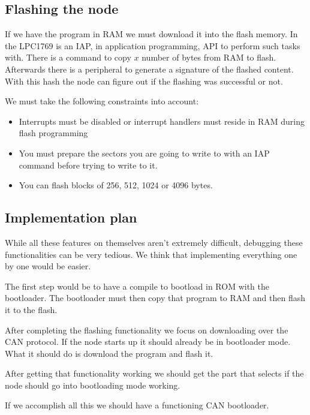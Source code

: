 \documentclass[twocolumn]{article}
\begin{document}
	\subsection*{Flashing the node}
		If we have the program in RAM we must download it into the flash memory.
		In the LPC1769 is an IAP, in application programming, API to perform such tasks with.
		There is a command to copy $x$ number of bytes from RAM to flash.
		Afterwards there is a peripheral to generate a signature of the flashed content.
		With this hash the node can figure out if the flashing was successful or not.
		
		We must take the following constraints into account:
		\begin{itemize}
			\item Interrupts must be disabled or interrupt handlers must reside in RAM during flash programming
			\item You must prepare the sectors you are going to write to with an IAP command before trying to write to it.
			\item You can flash blocks of 256, 512, 1024 or 4096 bytes.
		\end{itemize}
	
	
	
	
	
	
	
	\subsection*{Implementation plan}
		While all these features on themselves aren't extremely difficult, debugging these functionalities can be very tedious.
		We think that implementing everything one by one would be easier.
		
		The first step would be to have a compile to bootload in ROM with the bootloader.
		The bootloader must then copy that program to RAM and then flash it to the flash.
		
		After completing the flashing functionality we focus on downloading over the CAN protocol.
		If the node starts up it should already be in bootloader mode.
		What it should do is download the program and flash it.
		
		After getting that functionality working we should get the part that selects if the node should go into bootloading mode working.
		
		If we accomplish all this we should have a functioning CAN bootloader.
\end{document}
